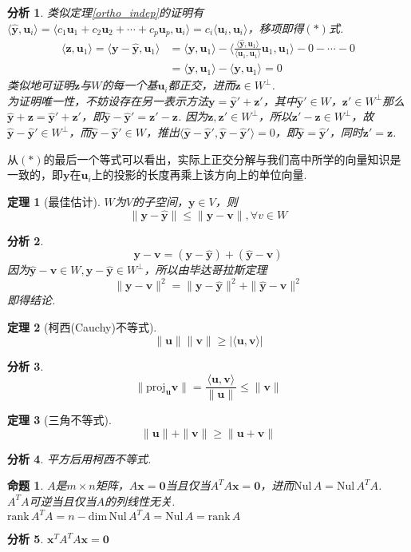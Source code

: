 \documentclass[11pt,UTF8]{ctexart}
\newtheorem{theorem}{定理}
\newtheorem{proposition}{命题}
\newtheorem*{analysis}{分析}
\def\vx{\mathbf{x}}
\def\vy{\mathbf{y}}
\def\vv{\mathbf{v}}
\def\dim{\mathrm{dim}\,}
\def\rank{\mathrm{rank}\,}
\def\nul{\mathrm{Nul}\,}
\newcommand{\proj}[1]{\mathrm{proj}_{#1}}
\newcommand{\inp}[2]{\langle #1,#2 \rangle}
\newcommand{\vb}[1]{\mathbf{#1}}
\begin{document}
\begin{analysis}
类似定理\ref{ortho_indep}的证明有$\inp{\hat{\vb{y}}}{\vb{u}_i}=\inp{c_1\vb{u}_1+c_2\vb{u}_2+\cdots+c_p\vb{u}_p}{\vb{u}_i}=c_i\inp{\vb{u}_i}{\vb{u}_i}$，移项即得$(*)$式.
\[\begin{aligned}\inp{\vb{z}}{\vb{u}_1}=\inp{\vb{y}-\hat{\vb{y}}}{\vb{u}_1}&=\inp{\vb{y}}{\vb{u}_1}-\inp{\frac{\langle \hat{\mathbf{y}},\mathbf{u}_1\rangle}{\langle\mathbf{u}_1,\mathbf{u}_1\rangle}\mathbf{u}_1}{\vb{u}_1}-0-\cdots-0\\
&=\inp{\vb{y}}{\vb{u}_1}-\inp{\vb{y}}{\vb{u}_1}=0\end{aligned}\]
类似地可证明$\vb{z}$与$W$的每一个基$\vb{u}_i$都正交，进而$\vb{z}\in W^\perp$.\\
为证明唯一性，不妨设存在另一表示方法$\vb{y}=\hat{\vb{y}}'+\vb{z'}$，其中$\hat{\vb{y}}'\in W$，$\vb{z'}\in W^\perp$那么$\hat{\vb{y}}+\vb{z}=\hat{\vb{y}}'+\vb{z'}$，即$\hat{\vb{y}}-\hat{\vb{y}}'=\vb{z'}-\vb{z}$. 因为$\vb{z},\vb{z'}\in W^\perp$，所以$\vb{z'}-\vb{z}\in W^\perp$，故$\hat{\vb{y}}-\hat{\vb{y}}'\in W^\perp$，而$\hat{\vb{y}}-\hat{\vb{y}}'\in W$，推出$\inp{\hat{\vb{y}}-\hat{\vb{y}}'}{\hat{\vb{y}}-\hat{\vb{y}}'}=0$，即$\hat{\vb{y}}=\hat{\vb{y}}'$，同时$\vb{z'}=\vb{z}$.
\end{analysis}
\par 从$(*)$的最后一个等式可以看出，实际上正交分解与我们高中所学的向量知识是一致的，即$\mathbf{y}$在$\mathbf{u}_i$上的投影的长度再乘上该方向上的单位向量.
\begin{theorem}[最佳估计]
$W$为$V$的子空间，$\vb{y}\in V$，则
\[\|\mathbf{y}-\hat{\mathbf{y}}\|\leq\|\mathbf{y}-\mathbf{v}\|,\forall v\in W\]
\end{theorem}
\begin{analysis}
\[\vy-\vv=(\vy-\hat{\vy})+(\hat{\vy}-\vv)\]
因为$\hat{\vy}-\vv\in W,\vy-\hat{\vy}\in W^\perp$，所以由毕达哥拉斯定理
\[\|\vy-\vv\|^2=\|\vy-\hat{\vy}\|^2+\|\hat{\vy}-\vv\|^2\]
即得结论.
\end{analysis}
\begin{theorem}[柯西(Cauchy)不等式]
\[\|\mathbf{u}\|\|\mathbf{v}\|\geq|\langle \mathbf{u},\mathbf{v} \rangle|\]
\end{theorem}
\begin{analysis}
\[\|\proj{\vb{u}}\vv\|=\dfrac{\inp{\vb{u}}{\vv}}{\|\vb{u}\|}\leq\|\vv\|\]
\end{analysis}
\begin{theorem}[三角不等式]
\[\|\mathbf{u}\|+\|\mathbf{v}\|\geq\|\mathbf{u}+\mathbf{v}\|\]
\end{theorem}
\begin{analysis}
平方后用柯西不等式.
\end{analysis}
\begin{proposition}%
$A$是$m\times n$矩阵，$A\vx=\vb{0}$当且仅当$A^TA\vx=\vb{0}$，进而$\nul A=\nul A^TA$.\\
$A^TA$可逆当且仅当$A$的列线性无关. $\rank A^TA=n-\dim\nul A^TA=\nul A=\rank A$
\end{proposition}
\begin{analysis}
$\vx^TA^TA\vx=\vb{0}$
\end{analysis}
\end{document}
